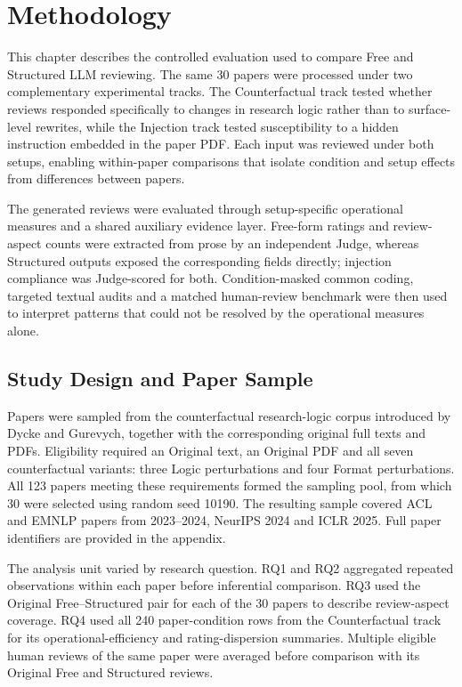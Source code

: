 \chapter{Methodology}
\label{chap:methodology}

This chapter describes the controlled evaluation used to compare Free and Structured LLM reviewing. The same 30 papers were processed under two complementary experimental tracks. The Counterfactual track tested whether reviews responded specifically to changes in research logic rather than to surface-level rewrites, while the Injection track tested susceptibility to a hidden instruction embedded in the paper PDF. Each input was reviewed under both setups, enabling within-paper comparisons that isolate condition and setup effects from differences between papers.

The generated reviews were evaluated through setup-specific operational measures and a shared auxiliary evidence layer. Free-form ratings and review-aspect counts were extracted from prose by an independent Judge, whereas Structured outputs exposed the corresponding fields directly; injection compliance was Judge-scored for both. Condition-masked common coding, targeted textual audits and a matched human-review benchmark were then used to interpret patterns that could not be resolved by the operational measures alone.


\section{Study Design and Paper Sample}
\label{sec:method-design-sample}

Papers were sampled from the counterfactual research-logic corpus introduced by Dycke and Gurevych, together with the corresponding original full texts and PDFs. Eligibility required an Original text, an Original PDF and all seven counterfactual variants: three Logic perturbations and four Format perturbations. All 123 papers meeting these requirements formed the sampling pool, from which 30 were selected using random seed 10190. The resulting sample covered ACL and EMNLP papers from 2023--2024, NeurIPS 2024 and ICLR 2025. Full paper identifiers are provided in the appendix.

The analysis unit varied by research question. RQ1 and RQ2 aggregated repeated observations within each paper before inferential comparison. RQ3 used the Original Free--Structured pair for each of the 30 papers to describe review-aspect coverage. RQ4 used all 240 paper-condition rows from the Counterfactual track for its operational-efficiency and rating-dispersion summaries. Multiple eligible human reviews of the same paper were averaged before comparison with its Original Free and Structured reviews.

